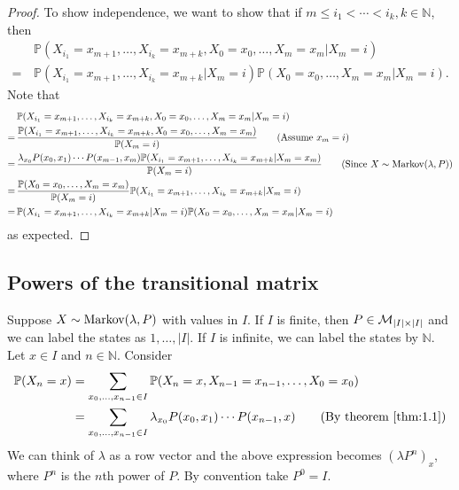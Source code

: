 \documentclass[a4paper]{article}
\begin{document}
\begin{proof}
    To show independence, we want to show that if $ m\le i_1<\cdots<i_k,k\in \mathbb{N}  $, then 
    \begin{align*}
        &\mathbb{P}(X_{i_1}=x_{m+1},\dots,X_{i_k}=x_{m+k},X_0=x_0,\dots,X_m=x_m|X_m=i)\tag{$*$}\\ 
        =\,& \mathbb{P}(X_{i_1}=x_{m+1},\dots,X_{i_k}=x_{m+k}|X_m=i)\mathbb{P}(X_0=x_0,\dots,X_m=x_m|X_m=i).
    \end{align*}
    Note that 
    \begin{align*}
        & \mathbb{P}(X_{i_1}=x_{m+1},\dots,X_{i_k}=x_{m+k},X_0=x_0,\dots,X_m=x_m|X_m=i)\\ 
        =\,& \frac{\mathbb{P}(X_{i_1}=x_{m+1},\dots,X_{i_k}=x_{m+k},X_0=x_0,\dots,X_m=x_m)}{\mathbb{P}(X_m=i)}\tag{Assume $ x_m=i $}\\ 
        =\,& \frac{\lambda_{x_0}P(x_0,x_1)\cdots P(x_{m-1},x_m)\mathbb{P}(X_{i_1}=x_{m+1},\dots,X_{i_k}=x_{m+k}|X_m=x_m)}{\mathbb{P}(X_m=i)}\tag{Since $ X\sim \Markov(\lambda,P) $}\\ 
        =\,& \frac{\mathbb{P}(X_0=x_0,\dots,X_m=x_m)}{\bbP(X_m=i)}\mathbb{P}(X_{i_1}=x_{m+1},\dots,X_{i_k}=x_{m+k}|X_m=i)\\ 
        =\,& \mathbb{P}(X_{i_1}=x_{m+1},\dots,X_{i_k}=x_{m+k}|X_m=i)\mathbb{P}(X_0=x_0,\dots,X_m=x_m|X_m=i)
    \end{align*}
    as expected.
\end{proof}
\subsection{Powers of the transitional matrix}
Suppose $ X \sim \operatorname{Markov}(\lambda,P) $ with values in $I$. If $I$ is finite, then $ P\in {\mathcal{M}}_{|I|\times |I|} $ and we can label the states as $1,\dots,|I|$. If $I$ is infinite, we can label the states by $ \mathbb{N} $. Let $x\in I$ and $n\in \mathbb{N}$. Consider 
\begin{align*}
    \mathbb{P}(X_n=x)&= \sum_{x_0,\dots,x_{n-1}\in I}\mathbb{P}(X_n=x,X_{n-1}=x_{n-1},\dots,X_0=x_0)\\ 
    &= \sum_{x_0,\dots,x_{n-1}\in I} \lambda_{x_0}P(x_0,x_1)\cdots P(x_{n-1},x)\tag{By theorem \ref{thm:1.1}}
\end{align*}
We can think of $\lambda$ as a row vector and the above expression becomes $ (\lambda P^n)_x $, where $P^n$ is the $n$th power of $P$. By convention take $P^0=I$.
\end{document}
